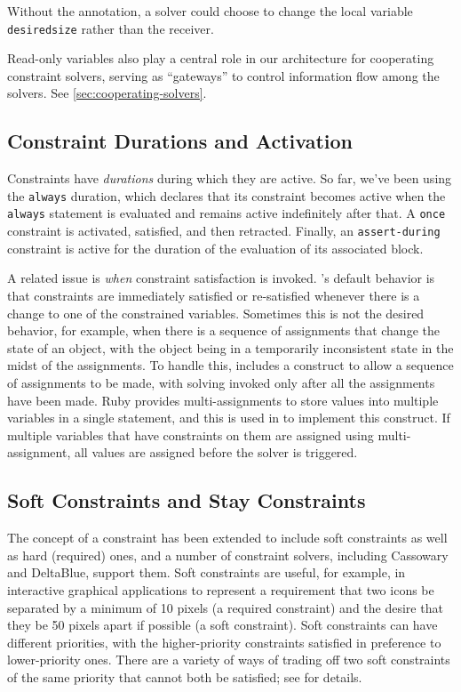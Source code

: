 Without the annotation, a solver could choose to change the local
variable \lstinline{desiredsize} rather than the receiver.

Read-only variables also play a central role in our architecture for
cooperating constraint solvers, serving as ``gateways'' to control
information flow among the solvers.  See
\autoref{sec:cooperating-solvers}.

\subsection{Constraint Durations and Activation}
\label{sec:constraint-durations-and-activation}

Constraints have \emph{durations} during which they are active.  So
far, we've been using the \lstinline{always} duration, which declares
that its constraint becomes active when the \lstinline{always}
statement is evaluated and remains active indefinitely after that. A
\lstinline{once} constraint is activated, satisfied, and then
retracted.  Finally, an \lstinline{assert-during} constraint is active
for the duration of the evaluation of its associated block.

A related issue is \emph{when} constraint satisfaction is invoked.
\langname's default behavior is that constraints are immediately
satisfied or re-satisfied whenever there is a change to one of the
constrained variables.  Sometimes this is not the desired behavior,
for example, when there is a sequence of assignments that change the
state of an object, with the object being in a temporarily
inconsistent state in the midst of the assignments.  To handle this,
\langname includes a construct to allow a sequence of assignments to
be made, with solving invoked only after all the assignments have been
made.  Ruby provides multi-assignments to store values into multiple
variables in a single statement, and this is used in \toolname to
implement this construct.  If multiple variables that have constraints
on them are assigned using multi-assignment, all values are assigned
before the solver is triggered.

\subsection{Soft Constraints and Stay Constraints}
\label{sec:soft-constraints}

The concept of a constraint has been extended to include soft
constraints as well as hard (required) ones, and a number of
constraint solvers, including Cassowary and DeltaBlue, support them.
Soft constraints are useful, for example, in interactive graphical
applications to represent a requirement that two icons be separated by
a minimum of 10 pixels (a required constraint) and the desire that
they be 50 pixels apart if possible (a soft constraint).  Soft
constraints can have different priorities, with the higher-priority
constraints satisfied in preference to lower-priority ones.  There are
a variety of ways of trading off two soft constraints of the same
priority that cannot both be satisfied; see
\cite{borning-lisp-symbolic-computation-1992} for details.

